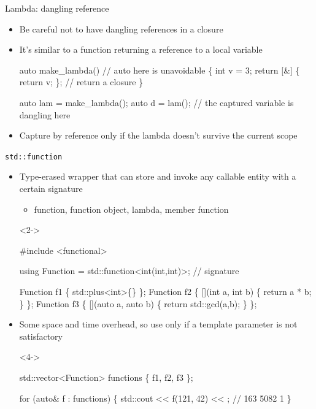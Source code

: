 \begin{frame}[fragile]{Lambda: dangling reference}

  \begin{itemize}
  \item Be careful not to have dangling references in a closure
  \item It's similar to a function returning a reference to a local variable

  \begin{codeblock}
auto make\_lambda() // auto here is unavoidable
\{
  int v = 3;
  return [\alert{&}] \{ return v; \}; // return a closure
\}

auto lam = make\_lambda();
auto d = lam(); // the captured variable is dangling here\end{codeblock}

  \item<2-> Capture by reference only if the lambda doesn't survive the current
    scope
  \end{itemize}

\end{frame}

\begin{frame}[fragile]{\texttt{std::function}}

  \begin{itemize}
  \item Type-erased wrapper that can store and invoke any callable entity with a
    certain signature
    \begin{itemize}
    \item function, function object, lambda, member function
    \end{itemize}

    \begin{codeblock}<2->{
#include <functional>

using Function = std::function<\alert{int(int,int)}>; // \alert{signature}

Function f1 \{ std::plus<int>\{\} \};
Function f2 \{ [](int a, int b) \{ return a * b; \} \};
Function f3 \{ [](auto a, auto b) \{ return std::gcd(a,b); \} \};}\end{codeblock}

  \item<3-> Some space and time overhead, so use only if a template parameter is
    not satisfactory
    \begin{codeblock}<4->{
std::vector<Function> functions \{ f1, f2, f3 \};

for (auto& f : functions) \{
  std::cout << f(121, 42) << \bslashn; // 163 5082 1
\}}\end{codeblock}

  \end{itemize}

\end{frame}

